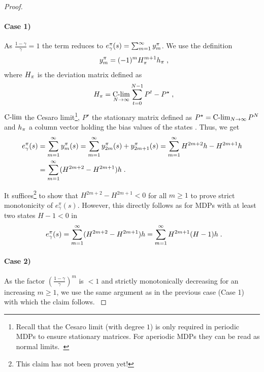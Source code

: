 \documentclass[envcountsame]{llncs}
\newcommand\MS[2][r]{\ifx t#1 \textcolor{blue}{[\textbf{MS:} #2]}
  \else \begin{center}\textcolor{blue}{\textbf{MS:} #2} \end{center} \fi}
\begin{document}
\begin{proof}
  \paragraph{Case 1)}
  { As \(\frac{1-\gamma}{\gamma} = 1 \) the term reduces to
    \(e_{\gamma}^{\pi}(s) = \sum_{m=1}^{\infty} y_{m}^{\pi}\). We use the definition
    \begin{align*}
      y_{m}^{\pol}=(-1)^{m} H_{\pol}^{m+1} h_{\pol} \tcom
    \end{align*}
    where \(H_{\pi}\) is the deviation matrix defined as
    \begin{align*}
      H_{\pol} = \clim_{N \to \infty} \sum_{t=0}^{N-1}{P^{t}-P^{\star}} \tcom
    \end{align*}
    \(\operatorname*{C-lim}\) the Cesaro limit\footnote{Recall that the Cesaro limit (with degree \(1\)) is only
      required in periodic MDPs to ensure stationary matrices. For aperiodic MDPs they can be read
      as normal limits.~\cite[p.592ff]{Puterman94}}, \(P^{\star}\) the stationary matrix defined as
    \(P^{\star} = \operatorname*{C-lim}_{N \to \infty}P^{N}\) and \(h_{\pi}\) a column vector holding the bias values
    of the states \cite[]{Puterman94,MillerVeinott1969}. Thus, we get
    \begin{align*}
      e_{\gamma}^{\pol}(s) & = \sum_{m=1}^{\infty}y_{m}^{\pol}(s) = \sum_{m=1}^{\infty}{y_{2m}^{\pol}(s) + y_{2m+1}^{\pol}(s)}
                             = \sum_{m=1}^{\infty} H^{2m+2} h - H^{2m+1} h \\
                           & = \sum_{m=1}^{\infty} (H^{2m+2} - H^{2m+1}) h \tpkt
    \end{align*}

    It suffices\footnote{This claim has not been proven yet!} to show that $H^{2m+2} - H^{2m+1} < 0$
    for all $m \geqslant 1$ to prove strict monotonicity of $e_{\gamma}^{\pi}(s)$.
    However, this directly follows as for MDPs with at least two states \(H-1 < 0\) in
    \begin{align*}
      e_{\gamma}^{\pol}(s) = \sum_{m=1}^{\infty} (H^{2m+2} - H^{2m+1}) h = \sum_{m=1}^{\infty} H^{2m+1} (H - 1) h \tpkt
    \end{align*}
  }


  \paragraph{Case 2)}{ As the factor \((\frac{1-\gamma}{\gamma})^{m}\) is $<1$ and strictly
    monotonically decreasing for an increasing $m \geqslant 1$, we use the same argument as in the
    previous case (Case 1) with which the claim follows. }


\end{proof}
\end{document}
